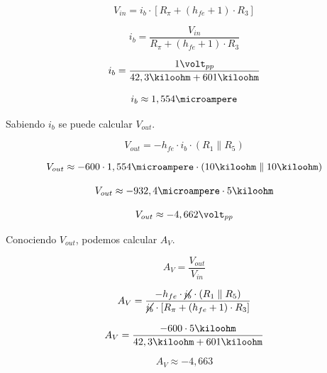 \documentclass[12pt,letterpaper]{article}     %
\begin{document}
\begin{equation}
	V_{in}=
	i_b\cdot
	[R_{\pi} +
	(h_{fe}+1) \cdot 
	R_3]
\end{equation}

\begin{equation}
	i_b=
	\frac{
		V_{in}
	}{
		R_{\pi} +
		(h_{fe}+1) \cdot 
		R_3
	}
\end{equation}

\begin{equation}
	i_b=
	\frac{
		1\volt_{pp}
	}{
		42,3\kiloohm +
		601\kiloohm
	}
\end{equation}

\begin{equation}
	i_b\approx
	1,554\microampere
\end{equation}

Sabiendo $i_b$ se puede calcular $V_{out}$.

\begin{equation}
	V_{out}=
	-h_{fe}\cdot
	i_b\cdot
	(R_1\parallel
	R_5)
\end{equation}

\begin{equation}
	V_{out}\approx
	-600\cdot
	1,554\microampere\cdot
	(10\kiloohm\parallel
	10\kiloohm)
\end{equation}

\begin{equation}
	V_{out}\approx
	-932,4\microampere\cdot
	5\kiloohm
\end{equation}

\begin{equation}
	V_{out}\approx
	-4,662\volt_{pp}
\end{equation}

Conociendo $V_{out}$, podemos calcular $A_V$.

\begin{equation}
	A_V=
	\frac{
		V_{out}
	}{
		V_{in}
	}
\end{equation}

\begin{equation}
	A_V=
	\frac{
		-h_{fe}\cdot
		\cancel{i_b}\cdot
		(R_1\parallel
		R_5)
	}{
		\cancel{i_b}\cdot
		[R_{\pi} +
		(h_{fe}+1)\cdot
		R_3]
	}
\end{equation}

\begin{equation}
	A_V=
	\frac{
		-600\cdot
		5\kiloohm
	}{
		42,3\kiloohm +
		601\kiloohm
	}
\end{equation}

\begin{equation}
	A_V\approx
	-4,663
\end{equation}
\end{document}
